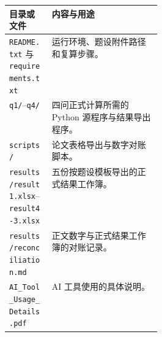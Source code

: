 \begin{center}
\small
\begin{tabularx}{0.96\linewidth}{@{}>{\raggedright\arraybackslash}p{0.29\linewidth}L@{}}
\toprule
目录或文件 & 内容与用途 \\
\midrule
\texttt{README.txt} 与 \texttt{requirements.txt} & 运行环境、题设附件路径和复算步骤。\\
\texttt{q1/}--\texttt{q4/} & 四问正式计算所需的 Python 源程序与结果导出程序。\\
\texttt{scripts/} & 论文表格导出与数字对账脚本。\\
\texttt{results/result1.xlsx}--\texttt{result4-3.xlsx} & 五份按题设模板导出的正式结果工作簿。\\
\texttt{results/reconciliation.md} & 正文数字与正式结果工作簿的对账记录。\\
\texttt{AI\_Tool\_Usage\_Details.pdf} & AI 工具使用的具体说明。\\
\bottomrule
\end{tabularx}
\end{center}
